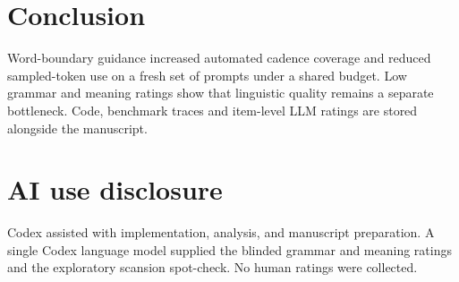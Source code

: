 \documentclass[11pt]{article}
\begin{document}
\section{Conclusion}
Word-boundary guidance increased automated cadence coverage and reduced sampled-token use on a fresh set of prompts under a shared budget. Low grammar and meaning ratings show that linguistic quality remains a separate bottleneck. Code, benchmark traces and item-level LLM ratings are stored alongside the manuscript.
\section*{AI use disclosure}
Codex assisted with implementation, analysis, and manuscript preparation. A single Codex language model supplied the blinded grammar and meaning ratings and the exploratory scansion spot-check. No human ratings were collected.


\end{document}
